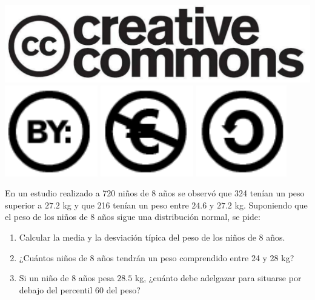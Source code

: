 \documentclass[aspectratio=149,10pt,xcolor=dvipsnames,t]{beamer}
\begin{document}
\begin{frame}[c]
\begin{center}
		\biskip
		\includegraphics[scale=0.07]{../img/cc-logo}
		\includegraphics[scale=0.2]{../img/cc-by}
		\includegraphics[scale=0.2]{../img/cc-e}
		\includegraphics[scale=0.2]{../img/cc-c}
	\end{center}
\end{frame}
	
\begin{frame}[c]
\large
En un estudio realizado a 720 niños de 8 años se observó que 324 tenían un peso superior a $27.2$ kg y que 216
tenían un peso entre $24.6$ y $27.2$ kg.
Suponiendo que el peso de los niños de 8 años sigue una distribución normal, se pide:
\begin{enumerate}
  \item Calcular la media y la desviación típica del peso de los niños de 8 años.
  \item ¿Cuántos niños de 8 años tendrán un peso comprendido entre 24 y 28 kg?
  \item Si un niño de 8 años pesa $28.5$ kg, ¿cuánto debe adelgazar para situarse por debajo del percentil 60 del peso?
\end{enumerate}
\end{frame}
	
\end{document}
